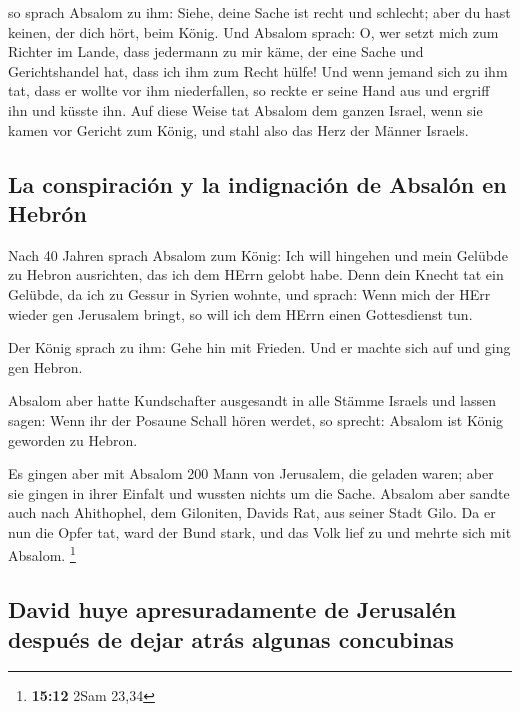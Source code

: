  so sprach Absalom zu ihm: Siehe, deine Sache ist recht
und schlecht; aber du hast keinen, der dich hört, beim König.
 Und Absalom sprach: O, wer setzt mich zum Richter im
Lande, dass jedermann zu mir käme, der eine Sache und Gerichtshandel
hat, dass ich ihm zum Recht hülfe!  Und wenn jemand sich
zu ihm tat, dass er wollte vor ihm niederfallen, so reckte er seine Hand
aus und ergriff ihn und küsste ihn.  Auf diese Weise tat
Absalom dem ganzen Israel, wenn sie kamen vor Gericht zum König, und
stahl also das Herz der Männer Israels.

\hypertarget{la-conspiraciuxf3n-y-la-indignaciuxf3n-de-absaluxf3n-en-hebruxf3n}{%
\subsection{La conspiración y la indignación de Absalón en
Hebrón}\label{la-conspiraciuxf3n-y-la-indignaciuxf3n-de-absaluxf3n-en-hebruxf3n}}

 Nach 40 Jahren sprach Absalom zum König: Ich will
hingehen und mein Gelübde zu Hebron ausrichten, das ich dem HErrn gelobt
habe.  Denn dein Knecht tat ein Gelübde, da ich zu Gessur
in Syrien wohnte, und sprach: Wenn mich der HErr wieder gen Jerusalem
bringt, so will ich dem HErrn einen Gottesdienst tun.

 Der König sprach zu ihm: Gehe hin mit Frieden. Und er
machte sich auf und ging gen Hebron.

 Absalom aber hatte Kundschafter ausgesandt in alle
Stämme Israels und lassen sagen: Wenn ihr der Posaune Schall hören
werdet, so sprecht: Absalom ist König geworden zu Hebron.

 Es gingen aber mit Absalom 200 Mann von Jerusalem, die
geladen waren; aber sie gingen in ihrer Einfalt und wussten nichts um
die Sache.  Absalom aber sandte auch nach Ahithophel, dem
Giloniten, Davids Rat, aus seiner Stadt Gilo. Da er nun die Opfer tat,
ward der Bund stark, und das Volk lief zu und mehrte sich mit Absalom.
\footnote{\textbf{15:12} 2Sam 23,34}

\hypertarget{david-huye-apresuradamente-de-jerusaluxe9n-despuuxe9s-de-dejar-atruxe1s-algunas-concubinas}{%
\subsection{David huye apresuradamente de Jerusalén después de dejar
atrás algunas
concubinas}\label{david-huye-apresuradamente-de-jerusaluxe9n-despuuxe9s-de-dejar-atruxe1s-algunas-concubinas}}

